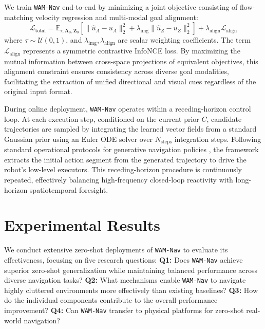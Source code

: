 \documentclass{article}
\begin{document}
We train \texttt{WAM-Nav} end-to-end by minimizing a joint objective consisting of flow-matching velocity regression and multi-modal goal alignment:
\begin{equation}
    \label{eq:l_total}
    \mathcal{L}_{\mathrm{total}} = \mathbb{E}_{\tau, \mathbf{A}_0, \mathbf{Z}_0} \left[ \|\hat{u}_A - u_A\|_2^2 + \lambda_{\mathrm{img}}\|\hat{u}_Z - u_Z\|_2^2 \right] + \lambda_{\mathrm{align}}\mathcal{L}_{\mathrm{align}}
\end{equation}
where $\tau \sim \mathcal{U}(0,1)$, and $\lambda_{\mathrm{img}}, \lambda_{\mathrm{align}}$ are scalar weighting coefficients. The term $\mathcal{L}_{\mathrm{align}}$ represents a symmetric contrastive InfoNCE loss. By maximizing the mutual information between cross-space projections of equivalent objectives, this alignment constraint ensures consistency across diverse goal modalities, facilitating the extraction of unified directional and visual cues regardless of the original input format.

During online deployment, \texttt{WAM-Nav} operates within a receding-horizon control loop. At each execution step, conditioned on the current prior $C$, candidate trajectories are sampled by integrating the learned vector fields from a standard Gaussian prior using an Euler ODE solver over $N_{\mathrm{steps}}$ integration steps. Following standard operational protocols for generative navigation policies \citep{sridhar2023nomad}, the framework extracts the initial action segment from the generated trajectory to drive the robot's low-level executors. This receding-horizon procedure is continuously repeated, effectively balancing high-frequency closed-loop reactivity with long-horizon spatiotemporal foresight.

\section{Experimental Results}
\label{sec:result}
We conduct extensive zero-shot deployments of \texttt{WAM-Nav} to evaluate its effectiveness, focusing on five research questions: 
\textbf{Q1:} Does \texttt{WAM-Nav} achieve superior zero-shot generalization while maintaining balanced performance across diverse navigation tasks?  
\textbf{Q2:} What mechanisms enable \texttt{WAM-Nav} to navigate highly cluttered environments more effectively than existing baselines?  
\textbf{Q3:} How do the individual components contribute to the overall performance improvement?  
\noindent\textbf{Q4:} Can \texttt{WAM-Nav} transfer to physical platforms for zero-shot real-world navigation?
\end{document}
